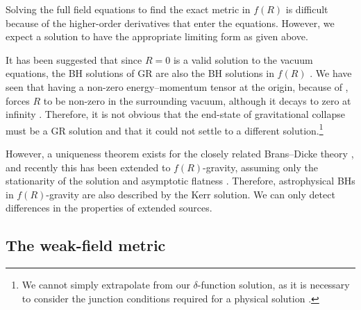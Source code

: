 Solving the full field equations to find the exact metric in $f(R)$ is difficult because of the higher-order derivatives that enter the equations. However, we expect a solution to have the appropriate limiting form as given above.

It has been suggested that since $R = 0$ is a valid solution to the vacuum equations, the BH solutions of GR are also the BH solutions in $f(R)$ \citep{Psaltis2008, Barausse2008}. We have seen that having a non-zero energy--momentum tensor at the origin, because of , forces $R$ to be non-zero in the surrounding vacuum, although it decays to zero at infinity \citep{Olmo2007c}. Therefore, it is not obvious that the end-state of gravitational collapse must be a GR solution and that it could not settle to a different solution.\footnote{We cannot simply extrapolate from our $\delta$-function solution, as it is necessary to consider the junction conditions required for a physical solution \citep{Deruelle2008}.}

However, a uniqueness theorem exists for the closely related Brans--Dicke theory \citep{Hawking1972a, Bekenstein1978, Thorne1971, Scheel1995}, and recently this has been extended to $f(R)$-gravity, assuming only the stationarity of the solution and asymptotic flatness \citep{Sotiriou2011}. Therefore, astrophysical BHs in $f(R)$-gravity are also described by the Kerr solution. We can only detect differences in the properties of extended sources.

\subsection{The weak-field metric}

